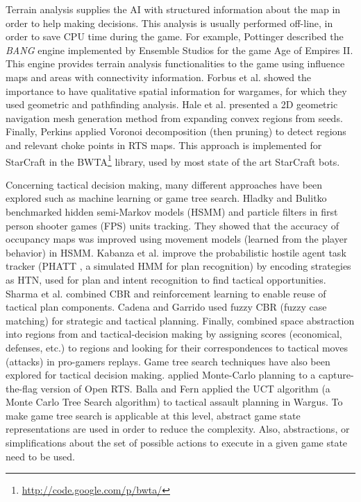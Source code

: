 \documentclass[journal]{IEEEtran}
\begin{document}
Terrain analysis supplies the AI with structured information about the map in order to help making decisions. This analysis is usually performed off-line, in order to save CPU time during the game. For example, Pottinger \cite{Pottinger00} described the \emph{BANG} engine implemented by Ensemble Studios for the game Age of Empires II. This engine provides terrain analysis functionalities to the game using influence maps and areas with connectivity information. 
Forbus et al. \cite{Forbus2002} showed the importance to have qualitative spatial information for wargames, for which they used geometric and pathfinding analysis. 
Hale et al. \cite{Hale08} presented a 2D geometric navigation mesh generation method from expanding convex regions from seeds. 
Finally, Perkins \cite{Perkins10} applied Voronoi decomposition (then pruning) %
to detect regions and relevant choke points in RTS maps. This approach is implemented for StarCraft in the BWTA\footnote{\url{http://code.google.com/p/bwta/}} library, used by most state of the art StarCraft bots.

Concerning tactical decision making, many different approaches have been explored such as machine learning or game tree search. 
Hladky and Bulitko \cite{Hladky2008} benchmarked hidden semi-Markov models (HSMM) and particle filters in first person shooter games (FPS) units tracking. They showed that the accuracy of occupancy maps was improved using movement models (learned from the player behavior) in HSMM. Kabanza et al. \cite{OBRecog} improve the probabilistic hostile agent task tracker (PHATT \cite{PHATT}, a simulated HMM for plan recognition) by encoding strategies as HTN, used for plan and intent recognition to find tactical opportunities. Sharma et al. \cite{CBR-RL} combined CBR and reinforcement learning to enable reuse of tactical plan components. Cadena and Garrido \cite{CadenaG11} used fuzzy CBR (fuzzy case matching) for strategic and tactical planning. Finally, \cite{SynnaeveTactics} combined space abstraction into regions from \cite{Perkins10} and tactical-decision making by assigning scores (economical, defenses, etc.) to regions and looking for their correspondences to tactical moves (attacks) in pro-gamers replays.
Game tree search techniques have also been explored for tactical decision making. \cite{Chung05} applied Monte-Carlo planning to a capture-the-flag version of Open RTS. Balla and Fern \cite{UCT} applied the UCT algorithm (a Monte Carlo Tree Search algorithm) to tactical assault planning in Wargus. To make game tree search is applicable at this level, abstract game state representations are used in order to reduce the complexity. Also, abstractions, or simplifications about the set of possible actions to execute in a given game state need to be used.
\end{document}
